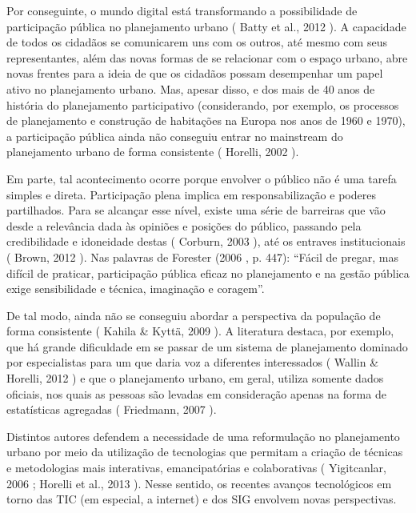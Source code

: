 \documentclass{article}
\begin{document}
Por conseguinte, o mundo digital está transformando a possibilidade de participação
				pública no planejamento urbano (%
Batty et al.,
					2012%
). A capacidade de todos os cidadãos se comunicarem uns com os
				outros, até mesmo com seus representantes, além das novas formas de se relacionar
				com o espaço urbano, abre novas frentes para a ideia de que os cidadãos possam
				desempenhar um papel ativo no planejamento urbano. Mas, apesar disso, e dos mais de
				40 anos de história do planejamento participativo (considerando, por exemplo, os
				processos de planejamento e construção de habitações na Europa nos anos de 1960 e
				1970), a participação pública ainda não conseguiu entrar no
mainstream%
 do planejamento urbano de forma consistente (%
Horelli, 2002%
).

Em parte, tal acontecimento ocorre porque envolver o público não é uma tarefa simples
				e direta. Participação plena implica em responsabilização e poderes partilhados.
				Para se alcançar esse nível, existe uma série de barreiras que vão desde a
				relevância dada às opiniões e posições do público, passando pela credibilidade e
				idoneidade destas (%
Corburn, 2003%
), até os
				entraves institucionais (%
Brown, 2012%
). Nas
				palavras de %
Forester (2006%
, p. 447): “Fácil
				de pregar, mas difícil de praticar, participação pública eficaz no planejamento e na
				gestão pública exige sensibilidade e técnica, imaginação e coragem”.

De tal modo, ainda não se conseguiu abordar a perspectiva da população de forma
				consistente (%
Kahila \& Kyttä, 2009%
). A
				literatura destaca, por exemplo, que há grande dificuldade em se passar de um
				sistema de planejamento dominado por especialistas para um que daria voz a
				diferentes interessados (%
Wallin \& Horelli,
					2012%
) e que o planejamento urbano, em geral, utiliza somente dados
				oficiais, nos quais as pessoas são levadas em consideração apenas na forma de
				estatísticas agregadas (%
Friedmann,
				2007%
).

Distintos autores defendem a necessidade de uma reformulação no planejamento urbano
				por meio da utilização de tecnologias que permitam a criação de técnicas e
				metodologias mais interativas, emancipatórias e colaborativas (%
Yigitcanlar, 2006%
; %
Horelli et
					al., 2013%
). Nesse sentido, os recentes avanços tecnológicos em torno das
				TIC (em especial, a internet) e dos SIG envolvem novas perspectivas.
\end{document}
